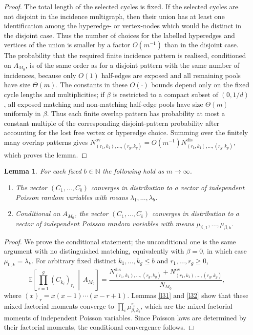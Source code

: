 \documentclass[11pt]{amsart}
\theoremstyle{plain}
\newtheorem{lemma}[theorem]{Lemma}
\numberwithin{equation}{section}
\numberwithin{theorem}{section}
\numberwithin{figure}{section}
\begin{document}
\begin{proof}
The total length of the selected cycles is fixed.  If the selected cycles are
not disjoint in the incidence multigraph, then their union has at least one
identification among the hyperedge- or vertex-nodes which would be distinct in
the disjoint case.  Thus the number of choices for the labelled hyperedges and
vertices of the union is smaller by a factor \(O(m^{-1})\) than in the disjoint
case.  The probability that the required finite incidence pattern is realised,
conditioned on \(A_{M_0}\), is of the same order as for a disjoint pattern with
the same number of incidences, because only \(O(1)\) half-edges are exposed and
all remaining pools have size \(\Theta(m)\).  The constants in these
\(O(\cdot)\) bounds depend only on the fixed cycle lengths and multiplicities;
if \(\beta\) is restricted to a compact subset of \((0,1/d)\), all exposed
matching and non-matching half-edge pools have size \(\Theta(m)\) uniformly in
\(\beta\).  Thus each finite overlap pattern has probability at most a constant
multiple of the corresponding disjoint-pattern probability after accounting for
the lost free vertex or hyperedge choice.  Summing over the finitely many
overlap patterns gives
\(N^{\mathrm{ov}}_{(r_1,k_1),\ldots,(r_g,k_g)}=O(m^{-1})
N^{\mathrm{dis}}_{(r_1,k_1),\ldots,(r_g,k_g)}\), which proves the lemma.
\end{proof}

\begin{lemma}\label{l33}
For each fixed \(b\in\mathbb N\) the following hold as \(m\to\infty\).
\begin{enumerate}
\item The vector \((C_1,\ldots,C_b)\) converges in distribution to a vector of
independent Poisson random variables with means \(\lambda_1,\ldots,\lambda_b\).
\item Conditional on \(A_{M_0}\), the vector \((C_1,\ldots,C_b)\) converges in
distribution to a vector of independent Poisson random variables with means
\(\mu_{\beta,1},\ldots,\mu_{\beta,b}\).
\end{enumerate}
\end{lemma}

\begin{proof}
We prove the conditional statement; the unconditional one is the same argument
with no distinguished matching, equivalently with \(\beta=0\), in which case
\(\mu_{0,k}=\lambda_k\).  For arbitrary fixed distinct \(k_1,\ldots,k_g\le b\) and
\(r_1,\ldots,r_g\ge0\),
\[
  \mathbb E\left[\prod_{i=1}^g (C_{k_i})_{r_i}\,\middle|\,A_{M_0}\right]
  =\frac{N^{\mathrm{dis}}_{(r_1,k_1),\ldots,(r_g,k_g)}
        +N^{\mathrm{ov}}_{(r_1,k_1),\ldots,(r_g,k_g)}}{N_{M_0}},
\]
where \((x)_r=x(x-1)\cdots(x-r+1)\).  Lemmas \ref{l31} and \ref{l32} show that
these mixed factorial moments converge to
\(\prod_i\mu_{\beta,k_i}^{r_i}\), which are the mixed factorial moments of
independent Poisson variables.  Since Poisson laws are determined by their
factorial moments, the conditional convergence follows.
\end{proof}
\end{document}
